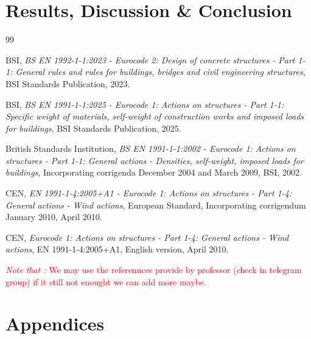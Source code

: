 \documentclass[12pt,twoside,a4paper,openany]{report}
\begin{document}
\section{Results, Discussion \& Conclusion}

\clearpage
\renewcommand{\chapter}{\section}
\renewcommand{\thechapter}{} %
\renewcommand{\bibname}{References}  %
\begin{thebibliography}{99}
BSI, \textit{BS EN 1992-1-1:2023 - Eurocode 2: Design of concrete structures - Part 1-1: General rules and rules for buildings, bridges and civil engineering structures}, BSI Standards Publication, 2023.

BSI, \textit{BS EN 1991-1-1:2025 - Eurocode 1: Actions on structures - Part 1-1: Specific weight of materials, self-weight of construction works and imposed loads for buildings}, BSI Standards Publication, 2025.

British Standards Institution, \textit{BS EN 1991-1-1:2002 - Eurocode 1: Actions on structures - Part 1-1: General actions - Densities, self-weight, imposed loads for buildings}, Incorporating corrigenda December 2004 and March 2009, BSI, 2002.

CEN, \textit{EN 1991-1-4:2005+A1 - Eurocode 1: Actions on structures - Part 1-4: General actions - Wind actions}, European Standard, Incorporating corrigendum January 2010, April 2010.

CEN, \textit{Eurocode 1: Actions on structures - Part 1-4: General actions - Wind actions}, EN 1991-1-4:2005+A1, English version, April 2010.

\end{thebibliography}

\noindent \textcolor{red}{\textit{Note that :} We may use the referennces provide by professor (check in telegram group) if it still not enought we can add more maybe.}
\clearpage

\section*{Appendices}

\end{document}
